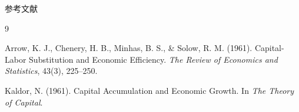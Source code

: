 \documentclass[aspectratio=32]{beamer}
\begin{document}
\begin{frame}{参考文献}
\small
\begin{thebibliography}{9}

Arrow, K. J., Chenery, H. B., Minhas, B. S., \& Solow, R. M. (1961).
\newblock Capital-Labor Substitution and Economic Efficiency.
\newblock \emph{The Review of Economics and Statistics}, 43(3), 225--250.

Kaldor, N. (1961).
\newblock Capital Accumulation and Economic Growth.
\newblock In \emph{The Theory of Capital}.
\end{thebibliography}

\begin{center}
\end{center}
\end{frame}
\end{document}
